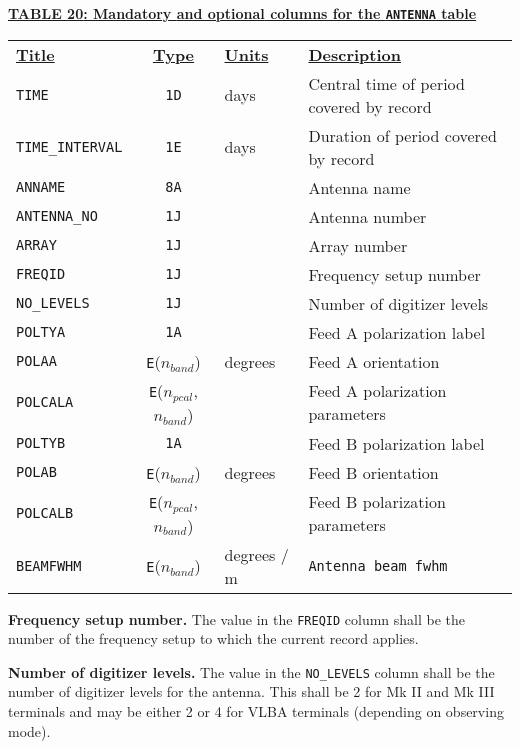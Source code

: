 \documentclass[twoside]{article}
\newcommand{\Hi}[1]{\textcolor{hicol}{#1}}
\newcommand{\Me}[1]{\textcolor{mecol}{#1}}
\newcommand{\nband}{$n_{band}$}
\newcommand{\npcal}{$n_{pcal}$}
\begin{document}
\begin{center}
\underline{\bf{TABLE \Hi{20}: Mandatory \Me{and optional} columns for
    the {\tt ANTENNA} table}}\\
\begin{tabular}{lcll}
\noalign{\vspace{2pt}}
\underline{{\bf Title\vphantom{y}}} & \underline{\bf{Type}} &
   \underline{{\bf Units\vphantom{y}}} & \underline{\bf{Description}} \\
\noalign{\vspace{2pt}}
{\tt TIME}    & {\tt 1D} & days     & Central time of period covered
                                      by record \\
{\tt TIME\_INTERVAL} & {\tt 1E} & days & Duration of period covered by
                                      record \\
{\tt ANNAME}  & {\tt 8A} &          & Antenna name \\
{\tt ANTENNA\_NO} & {\tt 1J} &       & Antenna number \\
{\tt ARRAY}   & {\tt 1J} &          & Array number \\
{\tt FREQID}  & {\tt 1J} &          & Frequency setup number \\
{\tt NO\_LEVELS} & {\tt 1J} &       & Number of digitizer levels \\
{\tt POLTYA}  & {\tt 1A} &          & Feed A polarization label \\
{\tt POLAA}   & {\tt E}(\nband) & degrees & Feed A orientation \\
{\tt POLCALA} & {\tt E}(\npcal,\nband) & & Feed A polarization
                                      parameters \\
{\tt POLTYB}  & {\tt 1A} &          & Feed B polarization label \\
{\tt POLAB}   & {\tt E}(\nband) & degrees & Feed B orientation \\
{\tt POLCALB} & {\tt E}(\npcal,\nband) & & Feed B polarization
                                      parameters \\
\hline
\Me{{\tt BEAMFWHM}} & \Me{{\tt E}(\nband)} & \Me{degrees / m} &
                                     \Me{{\tt Antenna beam fwhm}}
\end{tabular}
\end{center}

{\bf Frequency setup number.}  The value in the {\tt FREQID} column
shall be the number of the frequency setup to which the current record
applies.

{\bf Number of digitizer levels.}  The value in the {\tt NO\_LEVELS}
column shall be the number of digitizer levels for the antenna.  This
shall be 2 for Mk II and Mk III terminals and may be either 2 or 4 for
VLBA terminals (depending on observing mode).
\end{document}
